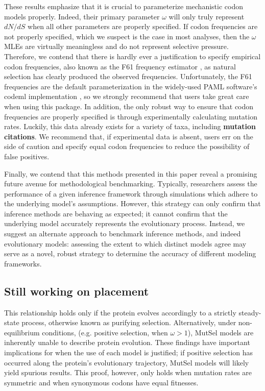 \documentclass[11pt]{article}
\begin{document}
These results emphasize that it is crucial to parameterize mechanistic codon models properly. Indeed, their primary parameter $\omega$ will only truly represent $dN/dS$ when all other parameters are properly specified. If codon frequencies are not properly specified, which we suspect is the case in most analyses, then the $\omega$ MLEs are virtually meaningless and do not represent selective pressure. Therefore, we contend that there is hardly ever a justification to specify empirical codon frequencies, also known as the F61 frequency estimator \cite{GoldmanYang1994}, as natural selection has clearly produced the observed frequencies. Unfortunately, the F61 frequencies are the default parameterization in the widely-used PAML software's codeml implementation \cite{Yang2007}, so we strongly recommend that users take great care when using this package.
In addition, the only robust way to ensure that codon frequencies are properly specified is through experimentally calculating mutation rates. Luckily, this data already exists for a variety of taxa, including \textbf{mutation citations}.  We recommend that, if experimental data is absent, users err on the side of caution and specify equal codon frequencies to reduce the possibility of false positives.


Finally, we contend that this methods presented in this paper reveal a promising future avenue for methodological benchmarking. Typically, researchers assess the performance of a given inference framework through simulations which adhere to the underlying model's assumptions. However, this strategy can only confirm that inference methods are behaving as expected; it cannot confirm that the underlying model accurately represents the evolutionary process. Instead, we suggest an alternate approach to benchmark inference methods, and indeed evolutionary models: assessing the extent to which distinct models agree may serve as a novel, robust strategy to determine the accuracy of different modeling frameworks.


\subsection*{Still working on placement}
This relationship holds only if the protein evolves accordingly to a strictly steady-state process, otherwise known as purifying selection. Alternatively, under non-equilibrium conditions, (e.g. positive selection, when $\omega > 1$), MutSel models are inherently unable to describe protein evolution. These findings have important implications for when the use of each model is justified; if positive selection has occurred along the protein's evolutionary trajectory, MutSel models will likely yield spurious results. This proof, however, only holds when mutation rates are symmetric and when synonymous codons have equal fitnesses. 
\end{document}
